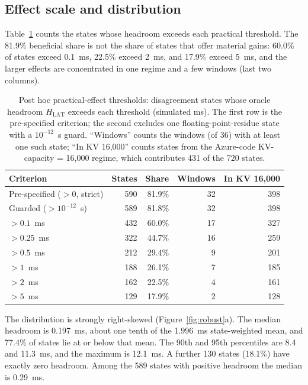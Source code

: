 \documentclass[preprint,12pt]{elsarticle}
\begin{document}
\subsection{Effect scale and distribution}
Table~\ref{tab:thresholds} counts the states whose headroom exceeds each
practical threshold. The 81.9\% beneficial share is not the share of states
that offer material gains: 60.0\% of states exceed 0.1~ms, 22.5\% exceed 2~ms,
and 17.9\% exceed 5~ms, and the larger effects are concentrated in one regime
and a few windows (last two columns).

\begin{table}[!htbp]
\centering
\small
\caption{Post hoc practical-effect thresholds: disagreement states whose oracle
headroom $H_{\mathrm{LAT}}$ exceeds each threshold (simulated ms). The first row is the
pre-specified criterion; the second excludes one floating-point-residue state
with a $10^{-12}$~s guard. ``Windows'' counts the windows (of 36) with at least
one such state; ``In KV 16,000'' counts states from the Azure-code
KV-capacity = 16,000 regime, which contributes 431 of the 720 states.}
\label{tab:thresholds}
\setlength{\tabcolsep}{5pt}
\renewcommand{\arraystretch}{1.15}
\begin{tabular}{@{}lrrrr@{}}
\toprule
Criterion & States & Share & Windows & In KV 16,000 \\
\midrule
Pre-specified ($>0$, strict) & 590 & 81.9\% & 32 & 398 \\
Guarded ($>10^{-12}$~s) & 589 & 81.8\% & 32 & 398 \\
\midrule
$>0.1$~ms & 432 & 60.0\% & 17 & 327 \\
$>0.25$~ms & 322 & 44.7\% & 16 & 259 \\
$>0.5$~ms & 212 & 29.4\% & 9 & 201 \\
$>1$~ms & 188 & 26.1\% & 7 & 185 \\
$>2$~ms & 162 & 22.5\% & 4 & 161 \\
$>5$~ms & 129 & 17.9\% & 2 & 128 \\
\bottomrule
\end{tabular}
\end{table}

The distribution is strongly right-skewed (Figure~\ref{fig:robust}a). The
median headroom is 0.197~ms, about one tenth of the 1.996~ms state-weighted mean,
and 77.4\% of states lie at or below that mean. The 90th and 95th percentiles are 8.4 and 11.3~ms, and the maximum is 12.1~ms. A further 130 states (18.1\%) have exactly zero headroom. Among the
589 states with positive headroom the median is 0.29~ms.
\end{document}
